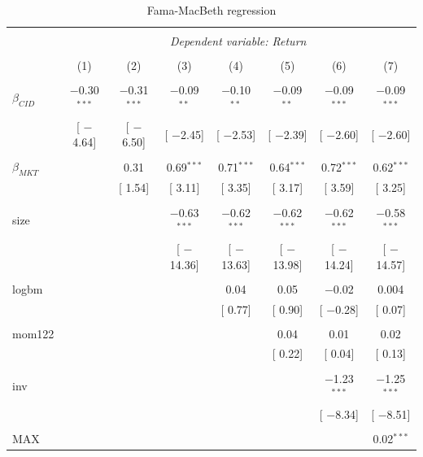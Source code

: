 \documentclass[16pt]{article}
\begin{document}
\begin{table}[!htbp] \centering 
  \caption{Fama-MacBeth regression} 
  \label{} 
\begin{tabular}{@{\extracolsep{0pt}}lccccccc} 
\\[-1.8ex]\hline 
\hline \\[-1.8ex] 
 & \multicolumn{7}{c}{\textit{Dependent variable: Return}} \\ 
\cline{2-8} 
\\[-1.8ex] & (1) & (2) & (3) & (4) & (5) & (6) & (7)\\ 
\hline \\[-1.8ex] 
 $\beta_{CID}$ & $-$0.30$^{***}$ & $-$0.31$^{***}$ & $-$0.09$^{**}$ & $-$0.10$^{**}$ & $-$0.09$^{**}$ & $-$0.09$^{***}$ & $-$0.09$^{***}$ \\ 
  & [ $-$4.64] & [ $-$6.50] & [ $-$2.45] & [ $-$2.53] & [ $-$2.39] & [ $-$2.60] & [ $-$2.60] \\ 
  & & & & & & & \\ 
 $\beta_{MKT}$ &  & 0.31 & 0.69$^{***}$ & 0.71$^{***}$ & 0.64$^{***}$ & 0.72$^{***}$ & 0.62$^{***}$ \\ 
  &  & [ 1.54] & [ 3.11] & [ 3.35] & [ 3.17] & [ 3.59] & [ 3.25] \\ 
  & & & & & & & \\ 
 size &  &  & $-$0.63$^{***}$ & $-$0.62$^{***}$ & $-$0.62$^{***}$ & $-$0.62$^{***}$ & $-$0.58$^{***}$ \\ 
  &  &  & [ $-$14.36] & [ $-$13.63] & [ $-$13.98] & [ $-$14.24] & [ $-$14.57] \\ 
  & & & & & & & \\ 
 logbm &  &  &  & 0.04 & 0.05 & $-$0.02 & 0.004 \\ 
  &  &  &  & [ 0.77] & [ 0.90] & [ $-$0.28] & [ 0.07] \\ 
  & & & & & & & \\ 
 mom122 &  &  &  &  & 0.04 & 0.01 & 0.02 \\ 
  &  &  &  &  & [ 0.22] & [ 0.04] & [ 0.13] \\ 
  & & & & & & & \\ 
 inv &  &  &  &  &  & $-$1.23$^{***}$ & $-$1.25$^{***}$ \\ 
  &  &  &  &  &  & [ $-$8.34] & [ $-$8.51] \\ 
  & & & & & & & \\ 
 MAX &  &  &  &  &  &  & 0.02$^{***}$ \\ 

\end{tabular}
\end{table}
\end{document}
